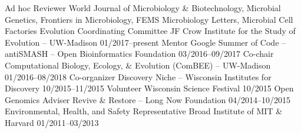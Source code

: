 

\begin{cvhonors}
  \cvhonor
    {Ad hoc Reviewer} %
    {World Journal of Microbiology \& Biotechnology, Microbial Genetics, Frontiers in Microbiology, FEMS Microbiology Letters, Microbial Cell Factories} %
    {} %
  \cvhonor
    {Evolution Coordinating Committee} %
    {JF Crow Institute for the Study of Evolution -- UW-Madison} %
    {01/2017--present} %
  \cvhonor
    {Mentor} %
    {Google Summer of Code -- antiSMASH -- Open Bioinformatics Foundation} %
    {03/2016--09/2017} %
  \cvhonor
    {Co-chair} %
    {Computational Biology, Ecology, \& Evolution (ComBEE) -- UW-Madison} %
    {01/2016--08/2018} %
  \cvhonor
    {Co-organizer} %
    {Discovery Niche -- Wisconsin Institutes for Discovery} %
    {10/2015--11/2015} %
  \cvhonor
    {Volunteer} %
    {Wisconsin Science Festival} %
    {10/2015} %
  \cvhonor
    {Open Genomics Adviser} %
    {Revive \& Restore -- Long Now Foundation} %
    {04/2014--10/2015} %
  \cvhonor
    {Environmental, Health, and Safety Representative} %
    {Broad Institute of MIT \& Harvard} %
    {01/2011--03/2013} %
\end{cvhonors}